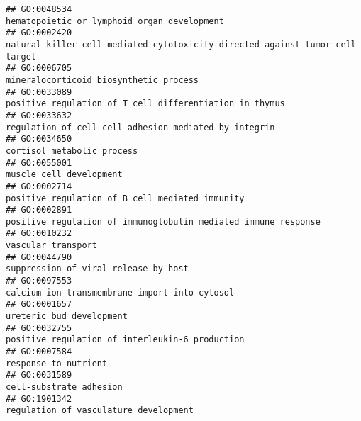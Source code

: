 \documentclass[
]{article}
\begin{document}
\begin{verbatim}
## GO:0048534                                                                                                      hematopoietic or lymphoid organ development
## GO:0002420                                                                     natural killer cell mediated cytotoxicity directed against tumor cell target
## GO:0006705                                                                                                           mineralocorticoid biosynthetic process
## GO:0033089                                                                                          positive regulation of T cell differentiation in thymus
## GO:0033632                                                                                            regulation of cell-cell adhesion mediated by integrin
## GO:0034650                                                                                                                       cortisol metabolic process
## GO:0055001                                                                                                                          muscle cell development
## GO:0002714                                                                                                  positive regulation of B cell mediated immunity
## GO:0002891                                                                                   positive regulation of immunoglobulin mediated immune response
## GO:0010232                                                                                                                               vascular transport
## GO:0044790                                                                                                             suppression of viral release by host
## GO:0097553                                                                                                    calcium ion transmembrane import into cytosol
## GO:0001657                                                                                                                         ureteric bud development
## GO:0032755                                                                                                  positive regulation of interleukin-6 production
## GO:0007584                                                                                                                             response to nutrient
## GO:0031589                                                                                                                          cell-substrate adhesion
## GO:1901342                                                                                                            regulation of vasculature development

\end{verbatim}
\end{document}
